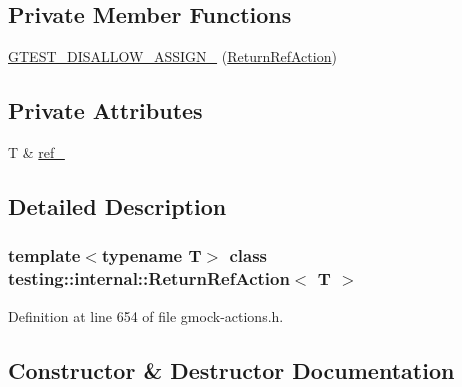\subsection*{Private Member Functions}
\begin{DoxyCompactItemize}
\item 
\hyperlink{classtesting_1_1internal_1_1ReturnRefAction_a7b26c9c4e02cdf2b82f76f32f8b8e053}{G\+T\+E\+S\+T\+\_\+\+D\+I\+S\+A\+L\+L\+O\+W\+\_\+\+A\+S\+S\+I\+G\+N\+\_\+} (\hyperlink{classtesting_1_1internal_1_1ReturnRefAction}{Return\+Ref\+Action})
\end{DoxyCompactItemize}
\subsection*{Private Attributes}
\begin{DoxyCompactItemize}
\item 
T \& \hyperlink{classtesting_1_1internal_1_1ReturnRefAction_ad63d08b72518c2059e0cc99c006cd620}{ref\+\_\+}
\end{DoxyCompactItemize}


\subsection{Detailed Description}
\subsubsection*{template$<$typename T$>$\newline
class testing\+::internal\+::\+Return\+Ref\+Action$<$ T $>$}



Definition at line 654 of file gmock-\/actions.\+h.



\subsection{Constructor \& Destructor Documentation}
\mbox{\label{classtesting_1_1internal_1_1ReturnRefAction_a1384b1cd78f3069f0493e2302f143701}} 
